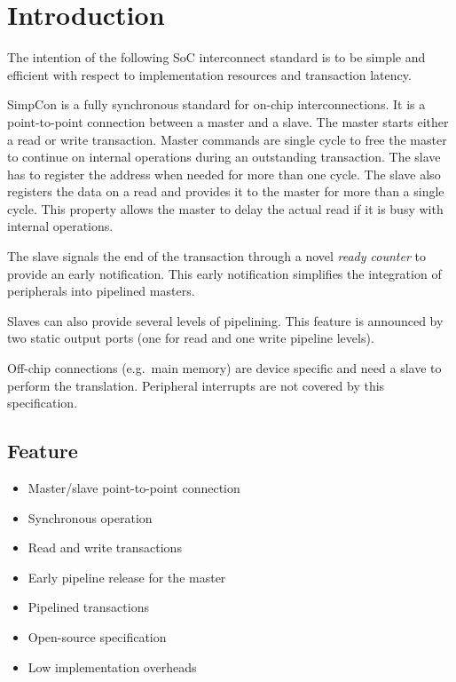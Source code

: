 
\section{Introduction}

The intention of the following SoC interconnect standard is to be
simple and efficient with respect to implementation resources and
transaction latency.

SimpCon is a fully synchronous standard for on-chip
interconnections. It is a point-to-point connection between a master
and a slave. The master starts either a read or write transaction.
Master commands are single cycle to free the master to continue on
internal operations during an outstanding transaction. The slave has
to register the address when needed for more than one cycle. The
slave also registers the data on a read and provides it to the
master for more than a single cycle. This property allows the master
to delay the actual read if it is busy with internal operations.

The slave signals the end of the transaction through a novel
\emph{ready counter} to provide an early notification. This early
notification simplifies the integration of peripherals into
pipelined masters.

Slaves can also provide several levels of pipelining. This feature
is announced by two static output ports (one for read and one write
pipeline levels).

Off-chip connections (e.g.\ main memory) are device specific and
need a slave to perform the translation. Peripheral interrupts are
not covered by this specification.

\subsection{Feature}

\begin{itemize}
    \item Master/slave point-to-point connection
    \item Synchronous operation
    \item Read and write transactions
    \item Early pipeline release for the master
    \item Pipelined transactions
    \item Open-source specification
    \item Low implementation overheads
\end{itemize}

